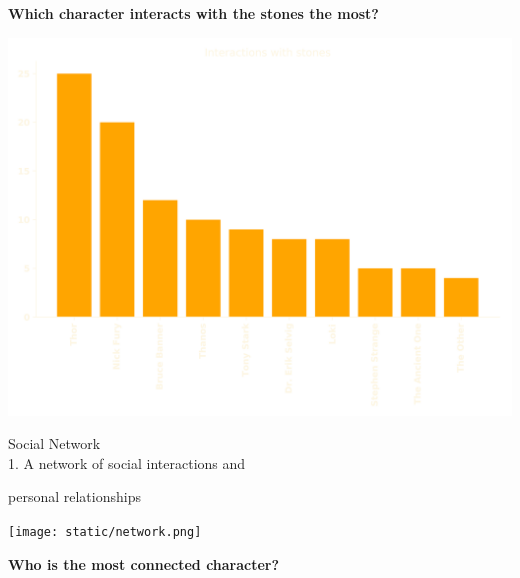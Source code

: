 \documentclass{beamer}
\begin{document}
\begin{frame}
    \centering
    \textbf{\large{Which character interacts with the stones the most?}}
\end{frame}

\begin{frame}
    \centering
    \includegraphics[width=\textwidth]{static/interactions_with_stones.png}
\end{frame}

\begin{frame}
    \hspace{.8cm} \LARGE{Social Network} \\

    \hspace{.8cm} \normalsize{1. A network of social interactions and}

    \hspace{1cm}\normalsize{personal relationships}
\end{frame}

\begin{frame}
    \centering
    
\end{frame}

\begin{frame}
    \centering
    \texttt{[image: static/network.png]}
\end{frame}

\begin{frame}
    \centering
    \textbf{\large{Who is the most connected character?}}
\end{frame}
\end{document}
